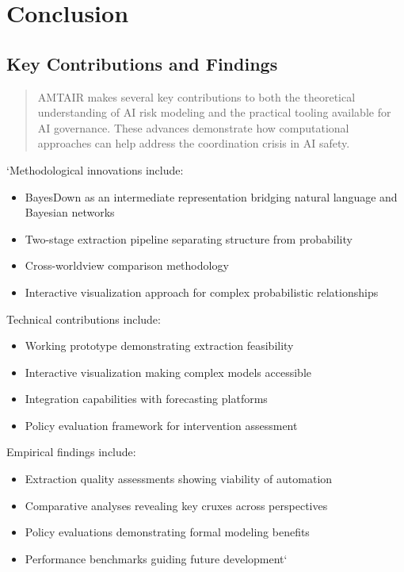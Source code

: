 \documentclass[]{book}
\providecommand{\tightlist}{%
  \setlength{\itemsep}{0pt}\setlength{\parskip}{0pt}}
\begin{document}

\chapter{Conclusion}\label{sec-conclusion}

\section{Key Contributions and Findings}\label{sec-key-contributions}

\begin{quote}
AMTAIR makes several key contributions to both the theoretical
understanding of AI risk modeling and the practical tooling available
for AI governance. These advances demonstrate how computational
approaches can help address the coordination crisis in AI safety.
\end{quote}

`Methodological innovations include:

\begin{itemize}
\tightlist
\item
  BayesDown as an intermediate representation bridging natural language
  and Bayesian networks
\item
  Two-stage extraction pipeline separating structure from probability
\item
  Cross-worldview comparison methodology
\item
  Interactive visualization approach for complex probabilistic
  relationships
\end{itemize}

Technical contributions include:

\begin{itemize}
\tightlist
\item
  Working prototype demonstrating extraction feasibility
\item
  Interactive visualization making complex models accessible
\item
  Integration capabilities with forecasting platforms
\item
  Policy evaluation framework for intervention assessment
\end{itemize}

Empirical findings include:

\begin{itemize}
\tightlist
\item
  Extraction quality assessments showing viability of automation
\item
  Comparative analyses revealing key cruxes across perspectives
\item
  Policy evaluations demonstrating formal modeling benefits
\item
  Performance benchmarks guiding future development`
\end{itemize}
\end{document}
